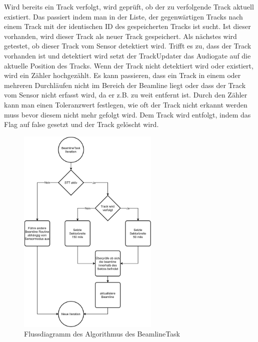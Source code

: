 Wird bereits ein Track verfolgt, wird geprüft, ob der zu verfolgende Track aktuell existiert. Das passiert indem man in der Liste, der gegenwärtigen 
Tracks nach einem Track mit der identischen ID des gespeicherten Tracks ist sucht. Ist dieser vorhanden, wird dieser Track als neuer Track gespeichert. 
Als nächstes wird getestet, ob dieser Track vom Sensor detektiert wird.  Trifft es zu, dass der Track vorhanden ist und detektiert wird setzt der 
TrackUpdater das Audiogate auf die aktuelle Position des Tracks. Wenn der Track nicht detektiert wird oder existiert, wird ein Zähler hochgezählt. Es 
kann passieren, dass ein Track in einem oder mehreren Durchläufen nicht im Bereich der Beamline liegt oder dass der Track vom Sensor nicht erfasst wird, 
da er z.B. zu weit entfernt ist. Durch den Zähler kann man einen Toleranzwert festlegen, wie oft der Track nicht erkannt werden muss bevor diesem nicht 
mehr gefolgt wird. Dem Track wird entfolgt, indem das Flag auf false gesetzt und der Track gelöscht wird.

\begin{figure}[ht]
    \centering
    \includegraphics[width=0.6\textwidth]{content/assets/BeamlineTaskSTT.png}
    \caption{Flussdiagramm des Algorithmus des BeamlineTask}
\end{figure}


